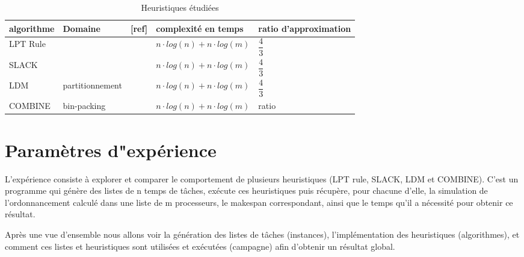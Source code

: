 \documentclass[a4paper,12pt]{report}
\theoremstyle{plain}				%
\theoremstyle{definition}				%
\newcommand{\fco}[1]{\todo[author=FCO,color=teal,inline]{#1}}
\begin{document}
\begin{table}[h] %
\centering
\begin{tabular}{p{3cm} p{3cm} p{1cm} p{4cm} p{4cm}}
\hline
algorithme 	& Domaine 
			& [ref] 
			& complexité en temps 
			& ratio d'approximation\\
\hline

LPT Rule 	&  
			& \cite{graham1966bounds} 
			& $n \cdot log(n) + n \cdot log(m)$ 
			& $\dfrac{4}{3}$ \\

SLACK   	& 
			& \cite{della2020longest} 
			&$n \cdot log(n) + n \cdot log(m)$ 
			& $\dfrac{4}{3}$ \\

LDM   		&  partitionnement 
			& \cite{karmarkar1982differencing} 
			& $n \cdot log(n) + n \cdot log(m)$ 
			& $\dfrac{4}{3}$ \\

COMBINE 	& bin-packing 
			& \cite{lee1988multiprocessor} 
			& $n \cdot log(n) + n \cdot log(m)$ 
			& ratio \\
\hline
\end{tabular}
\caption{Heuristiques étudiées}
\label{table:Heuritiques}
\end{table}


\bigskip



\section{Paramètres d"expérience} \label{sec:Paramètres d"expérience}
\fco{mal dit, revoir la phrase}
L’expérience consiste à explorer et comparer le comportement de plusieurs heuristiques (LPT rule, SLACK, LDM et COMBINE). C'est un programme qui génère des listes de n temps de tâches, exécute ces heuristiques puis récupère, pour chacune d'elle, la simulation de l’ordonnancement calculé dans une liste de m processeurs, le makespan correspondant, ainsi que le temps qu'il a nécessité pour obtenir ce résultat.

Après une vue d'ensemble nous allons voir la génération des listes de tâches (instances), l'implémentation des heuristiques (algorithmes), et comment ces listes et heuristiques sont utilisées et exécutées (campagne) afin d'obtenir un résultat global.
\end{document}
